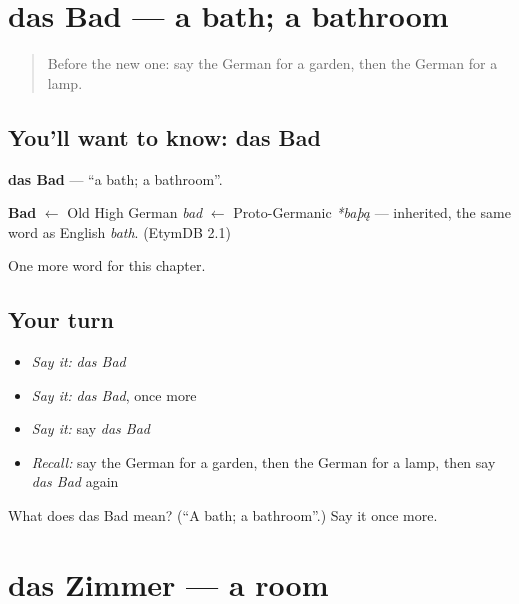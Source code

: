 \section[das Bad]{das Bad — a bath; a bathroom}

\label{lesson:GE-C77-bad}



\begin{quote}
Before the new one: say the German for a garden, then the German for a lamp.
\end{quote}

\subsection*{You'll want to know: das Bad}
\textbf{das Bad} — \textquotedblleft{}a bath; a bathroom\textquotedblright{}.

\begin{cousinweb}
\textbf{Bad} $\leftarrow$ Old High German \emph{bad} $\leftarrow$ Proto-Germanic \emph{*baþą} — inherited, the same word as English \emph{bath}. (EtymDB 2.1)
\end{cousinweb}

\begin{grammarlens}[title={What you've built}]
One more word for this chapter.
\end{grammarlens}

\subsection*{Your turn}
\begin{itemize}
\raggedright
  \item \emph{Say it:} \emph{das Bad}
  \item \emph{Say it:} \emph{das Bad}, once more
  \item \emph{Say it:} say \emph{das Bad}
  \item \emph{Recall:} say the German for a garden, then the German for a lamp, then say \emph{das Bad} again
\end{itemize}

\begin{tcolorbox}[breakable,colback=teal!4,colframe=teal!35!black,title={Before you move on}]
What does das Bad mean? (\textquotedblleft{}A bath; a bathroom\textquotedblright{}.) Say it once more.
\end{tcolorbox}
\section[das Zimmer]{das Zimmer — a room}

